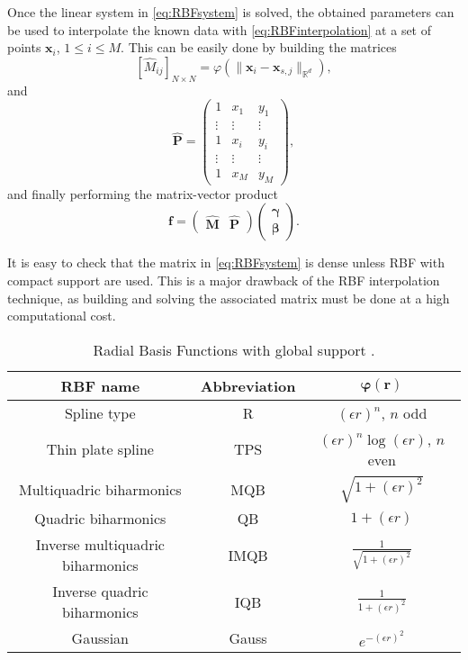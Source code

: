 \documentclass[12pt,a4paper]{article}
\theoremstyle{plain}
\theoremstyle{definition}
\begin{document}
Once the linear system in \eqref{eq:RBFsystem} is solved, the obtained parameters can be used to interpolate the known data with \eqref{eq:RBFinterpolation} at a set of points $\mathbf{x}_i$, $1 \leq i \leq M$. This can be easily done by building the matrices 
%
\begin{equation}
\left[ \hat{M}_{ij} \right]_{N \times N}=\varphi \left(\| \mathbf{x}_i - \mathbf{x}_{s, j} \|_{\mathbb{R}^d} \right),
\end{equation}
%
and
%
\begin{equation} 
\mathbf{\hat{P}} = \begin{pmatrix}
1 & x_{1} & y_{1} \\ 
\vdots & \vdots & \vdots \\ 
1 & x_{i} & y_{i} \\ 
\vdots & \vdots & \vdots \\ 
1 & x_{M} & y_{M}
\end{pmatrix},
\end{equation}
%
and finally performing the matrix-vector product
%
\begin{equation}
\mathbf{f} = 
\begin{pmatrix}
\mathbf{\hat{M}} & \mathbf{\hat{P}}
\end{pmatrix}
\begin{pmatrix}
\mathbf{\gamma} \\ 
\mathbf{\beta}
\end{pmatrix}.
\end{equation} 

It is easy to check that the matrix in \eqref{eq:RBFsystem} is dense unless RBF with compact support are used. This is a major drawback of the RBF interpolation technique, as building and solving the associated matrix must be done at a high computational cost.

\renewcommand{\arraystretch}{1.8}
\begin{table}[H]
\centering
\begin{tabular}{|c|c|c|}
\hline 
\textbf{RBF name} & \textbf{Abbreviation} & $\displaystyle  \mathbf{ \varphi \left( r \right) }$ \\ 
\hline
Spline type & R & $\left( \epsilon r \right)^n$, $n$ odd \\ 
\hline 
Thin plate spline & TPS & $\left( \epsilon r \right)^n \log\left( \epsilon r \right)$, $n$ even \\ 
\hline 
Multiquadric biharmonics & MQB & $\sqrt{1 + \left( \epsilon r \right) ^2}$ \\ 
\hline
Quadric biharmonics & QB & $1 + \left( \epsilon r \right)$ \\
\hline
Inverse multiquadric biharmonics & IMQB & $\displaystyle \frac{1}{\sqrt{1 + \left( \epsilon r \right) ^2}}$ \\ 
\hline 
Inverse quadric biharmonics & IQB & $\displaystyle \frac{1}{ 1 + \left( \epsilon r \right) ^2 }$ \\ 
\hline 
Gaussian & Gauss & $\displaystyle e^{-\left(\epsilon r \right)^2}$ \\ 
\hline 
\end{tabular}
\caption{Radial Basis Functions with global support \cite{biancolini2018, deboer2007}.}  \label{tab:RBFcompactsupport}
\end{table}
\end{document}
